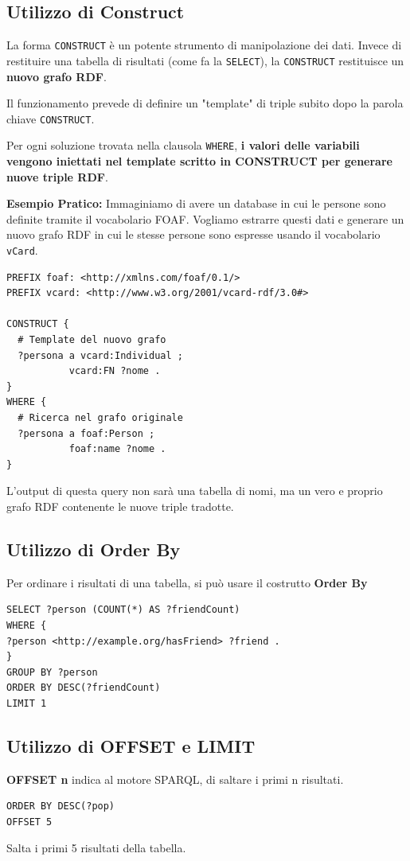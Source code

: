 \subsection{Utilizzo di Construct}
La forma \texttt{CONSTRUCT} è un potente strumento di manipolazione dei dati. Invece di restituire una tabella di risultati (come fa la \texttt{SELECT}), la \texttt{CONSTRUCT} restituisce un \textbf{nuovo grafo RDF}. 

Il funzionamento prevede di definire un "template" di triple subito dopo la parola chiave \texttt{CONSTRUCT}.

Per ogni soluzione trovata nella clausola \texttt{WHERE},\textbf{ i valori delle variabili vengono iniettati nel template scritto in CONSTRUCT per generare nuove triple RDF}. 

\textbf{Esempio Pratico:}
Immaginiamo di avere un database in cui le persone sono definite tramite il vocabolario FOAF. Vogliamo estrarre questi dati e generare un nuovo grafo RDF in cui le stesse persone sono espresse usando il vocabolario \texttt{vCard}.

\begin{lstlisting}
PREFIX foaf: <http://xmlns.com/foaf/0.1/>
PREFIX vcard: <http://www.w3.org/2001/vcard-rdf/3.0#>

CONSTRUCT {
  # Template del nuovo grafo
  ?persona a vcard:Individual ;
           vcard:FN ?nome .
}
WHERE {
  # Ricerca nel grafo originale
  ?persona a foaf:Person ;
           foaf:name ?nome .
}
\end{lstlisting}
L'output di questa query non sarà una tabella di nomi, ma un vero e proprio grafo RDF contenente le nuove triple tradotte.

\subsection{Utilizzo di Order By}
Per ordinare i risultati di una tabella, si può usare il costrutto \textbf{Order By}
\begin{lstlisting}
SELECT ?person (COUNT(*) AS ?friendCount)
WHERE {
?person <http://example.org/hasFriend> ?friend .
}
GROUP BY ?person
ORDER BY DESC(?friendCount)
LIMIT 1
\end{lstlisting}

\subsection{Utilizzo di OFFSET e LIMIT}
\textbf{OFFSET n} indica al motore SPARQL, di saltare i primi n risultati.
\begin{lstlisting}
ORDER BY DESC(?pop)
OFFSET 5
\end{lstlisting}
Salta i primi 5 risultati della tabella.


